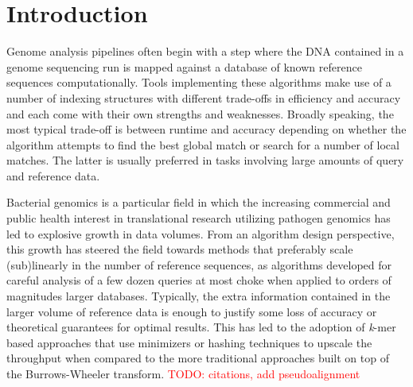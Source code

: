 \documentclass[unnumsec,webpdf,contemporary,large]{oup-authoring-template}%
\theoremstyle{thmstyleone}%
\theoremstyle{thmstyletwo}%
\theoremstyle{thmstylethree}%
\begin{document}

\maketitle


\section{Introduction}
Genome analysis pipelines often begin with a step where the DNA contained in a 
genome sequencing run
is mapped against a database of known reference sequences computationally. Tools implementing these algorithms make use of a number of indexing structures with different trade-offs in efficiency and accuracy and each come with their own strengths and weaknesses. Broadly speaking, the most typical trade-off is between runtime and accuracy depending on whether the algorithm attempts to find the best global match or search for a number of local matches. The latter is usually preferred in tasks involving large amounts of query and reference data.

Bacterial genomics is a particular field in which the increasing commercial and public health interest in translational research utilizing pathogen genomics has led to explosive growth in data volumes. From an algorithm design perspective, this growth has steered the field towards methods that preferably scale (sub)linearly in the number of reference sequences, as algorithms developed for careful analysis of a few dozen queries at most choke when applied to orders of magnitudes larger databases. Typically, the extra information contained in the larger volume of reference data is enough to justify some loss of accuracy or theoretical guarantees for optimal results. This has led to the adoption of \emph{k}-mer based approaches that use minimizers or hashing techniques to upscale the throughput when compared to the more traditional approaches built on top of the Burrows-Wheeler transform. \textcolor{red}{TODO: citations, add pseudoalignment}
\end{document}
